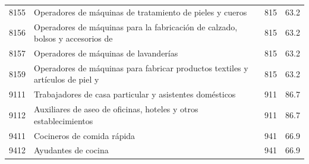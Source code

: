 \begin{longtable}{@{}c p{} c r@{}}
8155 & Operadores de máquinas de tratamiento de pieles y cueros & 815 & 63.2 \\
8156 & Operadores de máquinas para la fabricación de calzado, bolsos y accesorios de & 815 & 63.2 \\
8157 & Operadores de máquinas de lavanderías & 815 & 63.2 \\
8159 & Operadores de máquinas para fabricar productos textiles y artículos de piel y & 815 & 63.2 \\
9111 & Trabajadores de casa particular y asistentes domésticos & 911 & 86.7 \\
9112 & Auxiliares de aseo de oficinas, hoteles y otros establecimientos & 911 & 86.7 \\
9411 & Cocineros de comida rápida & 941 & 66.9 \\
9412 & Ayudantes de cocina & 941 & 66.9 \\
\end{longtable}
\endgroup
